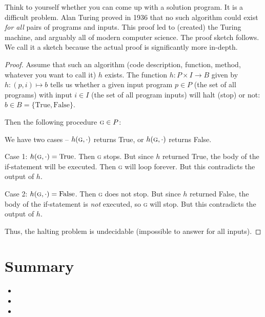 \documentclass[main.tex]{subfiles}
\begin{document}
Think to yourself whether you can come up with a solution program. It is a difficult problem. Alan Turing proved in 1936 that no such algorithm could exist \textit{for all} pairs of programs and inputs. This proof led to (created) the Turing machine, and arguably all of modern computer science. The proof sketch follows. We call it a sketch because the actual proof is significantly more in-depth.

\begin{proof}
	Assume that such an algorithm (code description, function, method, whatever you want to call it) \(h\) exists. The function \(h : P \times I \rightarrow B\) given by \(h : (p,i) \mapsto b\) tells us whether a given input program \(p \in P\) (the set of all programs) with input \(i \in I\) (the set of all program inputs) will halt (stop) or not: \(b \in B = \{\text{True}, \text{False}\}\).
	
	Then the following procedure \(\textsc{g} \in P\):
	\begin{algorithmic}[1]
				\EndWhile
			\EndIf
		\EndFunction
	\end{algorithmic}
	
	We have two cases -- \(h(\textsc{g},\cdot)\) returns True, or \(h(\textsc{g},\cdot)\) returns False.
	
	Case 1: \(h(\textsc{g},\cdot) = \text{True}\). Then \textsc{g} stops. But since \(h\) returned True, the body of the if-statement will be executed. Then \textsc{g} will loop forever. But this contradicts the output of \(h\).
	
	Case 2: \(h(\textsc{g},\cdot) = \text{False}\). Then \textsc{g} does not stop. But since \(h\) returned False, the body of the if-statement is \textit{not} executed, so \textsc{g} will stop. But this contradicts the output of \(h\).
	
	Thus, the halting problem is undecidable (impossible to answer for all inputs).
\end{proof}


\section{Summary}

\begin{itemize}
	\item 
	\item 
	\item 
\end{itemize}
\end{document}
